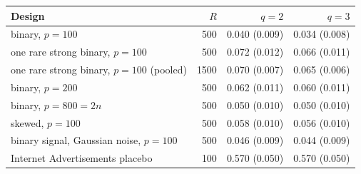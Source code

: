 \begin{tabular}{lrrr}
\toprule
Design & $R$ & $q = 2$ & $q = 3$ \\
\midrule
binary, $p = 100$ & 500 & 0.040 (0.009) & 0.034 (0.008) \\
one rare strong binary, $p = 100$ & 500 & 0.072 (0.012) & 0.066 (0.011) \\
one rare strong binary, $p = 100$ (pooled) & 1500 & 0.070 (0.007) & 0.065 (0.006) \\
binary, $p = 200$ & 500 & 0.062 (0.011) & 0.060 (0.011) \\
binary, $p = 800 = 2n$ & 500 & 0.050 (0.010) & 0.050 (0.010) \\
skewed, $p = 100$ & 500 & 0.058 (0.010) & 0.056 (0.010) \\
binary signal, Gaussian noise, $p = 100$ & 500 & 0.046 (0.009) & 0.044 (0.009) \\
\midrule
Internet Advertisements placebo & 100 & 0.570 (0.050) & 0.570 (0.050) \\
\bottomrule
\end{tabular}
